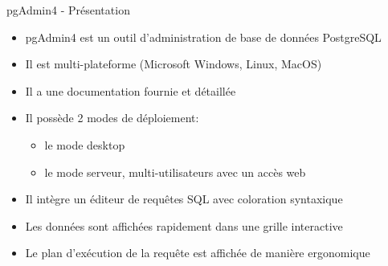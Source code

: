 
\begin{frame}{pgAdmin4 - Présentation}

   \begin{itemize}
      \item pgAdmin4 est un outil d'administration de base de données PostgreSQL
      \item Il est multi-plateforme (Microsoft Windows, Linux, MacOS)
      \item Il a une documentation fournie et détaillée
      \item Il possède 2 modes de déploiement:
      \begin{itemize}
         \item le mode desktop
         \item le mode serveur, multi-utilisateurs avec un accès web
      \end{itemize}
      \item Il intègre un éditeur de requêtes SQL avec coloration syntaxique
      \item Les données sont affichées rapidement dans une grille interactive
      \item Le plan d'exécution de la requête est affichée de manière ergonomique

   \end{itemize}

\begin{tiny}
\begin{toile}
\end{toile}
\end{tiny}

\end{frame}


